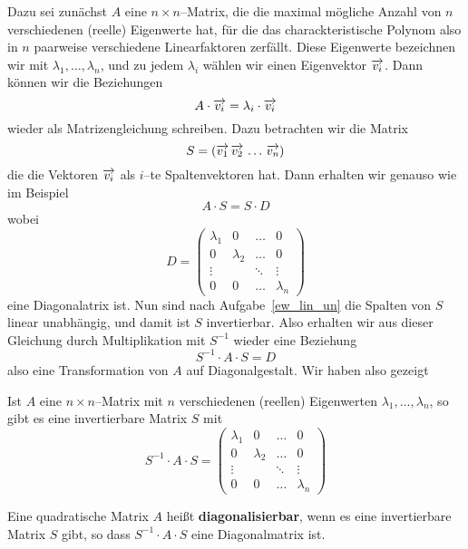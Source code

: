 Dazu sei zunächst $A$ eine $n \times n$--Matrix, die die maximal mögliche Anzahl 
von $n$ verschiedenen (reelle) Eigenwerte hat, für die das charackteristische 
Polynom also in $n$ paarweise verschiedene Linearfaktoren zerfällt. Diese 
Eigenwerte bezeichnen wir mit $\lambda_1, \ldots, \lambda_n$, und zu jedem $\lambda_i$ 
wählen wir einen Eigenvektor $\overrightarrow{v_i}$. Dann können wir die 
Beziehungen 
  	$$ A \cdot \overrightarrow{v_i} = \lambda_i \cdot \overrightarrow{v_i} $$
wieder als Matrizengleichung schreiben. Dazu betrachten wir die Matrix 
  	$$ S = \left( \overrightarrow{v_1} \, \overrightarrow{v_2} \, \ldots \, \overrightarrow{v_n} \right) $$ 
die die Vektoren $\overrightarrow{v_i}$ als $i$--te Spaltenvektoren hat. Dann erhalten 
wir genauso wie im Beispiel 
  	$$ A \cdot S = S \cdot D $$
wobei 
  	$$ D = \left( \begin{matrix} \lambda_1 & 0 & \ldots & 0 \\
   	0 & \lambda_2 & \ldots & 0 \\ \vdots & & \ddots & \vdots \\
  	0 & 0 & \ldots & \lambda_n \end{matrix} \right) $$
eine Diagonalatrix ist. Nun sind nach Aufgabe~\ref{ew_lin_un} die Spalten von $S$ linear 
unabhängig, und damit ist $S$ invertierbar. Also erhalten wir aus dieser Gleichung 
durch Multiplikation mit $S^{-1}$ wieder eine Beziehung
  	$$ S^{-1} \cdot A \cdot S = D $$
also eine Transformation von $A$ auf Diagonalgestalt. Wir haben also gezeigt

\begin{satz}\label{ew_satz_versch_ew} 
Ist $A$ eine $n \times n$--Matrix mit $n$ verschiedenen (reellen) 
Eigenwerten $\lambda_1, \ldots, \lambda_n$, so gibt es eine invertierbare Matrix $S$ mit
  	$$ S^{-1} \cdot A \cdot S = \left( \begin{matrix} \lambda_1 & 0 & \ldots & 0 \\
   	0 & \lambda_2 & \ldots & 0 \\ \vdots & & \ddots & \vdots \\
   	0 & 0 & \ldots & \lambda_n \end{matrix} \right) $$
\end{satz}

\bigbreak

\begin{definition} Eine quadratische Matrix $A$ heißt  
\textbf{diagonalisierbar}, wenn es eine invertierbare 
Matrix $S$ gibt, so dass $S^{-1} \cdot A \cdot S$ eine Diagonalmatrix ist.
\end{definition}

